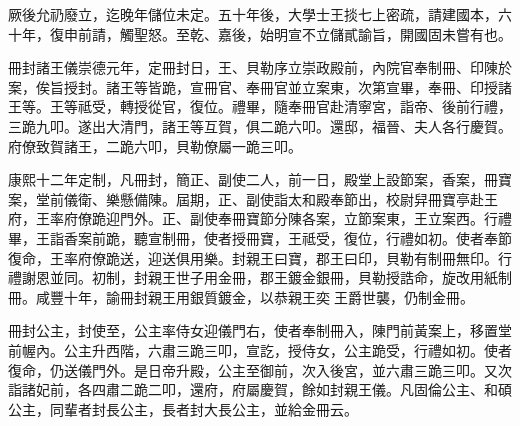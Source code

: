 \begin{pinyinscope}
厥後允礽廢立，迄晚年儲位未定。五十年後，大學士王掞七上密疏，請建國本，六十年，復申前請，觸聖怒。至乾、嘉後，始明宣不立儲貳諭旨，開國固未嘗有也。

冊封諸王儀崇德元年，定冊封日，王、貝勒序立崇政殿前，內院官奉制冊、印陳於案，俟旨授封。諸王等皆跪，宣冊官、奉冊官並立案東，次第宣畢，奉冊、印授諸王等。王等祗受，轉授從官，復位。禮畢，隨奉冊官赴清寧宮，詣帝、後前行禮，三跪九叩。遂出大清門，諸王等互賀，俱二跪六叩。還邸，福晉、夫人各行慶賀。府僚致賀諸王，二跪六叩，貝勒僚屬一跪三叩。

康熙十二年定制，凡冊封，簡正、副使二人，前一日，殿堂上設節案，香案，冊寶案，堂前儀衛、樂懸備陳。屆期，正、副使詣太和殿奉節出，校尉舁冊寶亭赴王府，王率府僚跪迎門外。正、副使奉冊寶節分陳各案，立節案東，王立案西。行禮畢，王詣香案前跪，聽宣制冊，使者授冊寶，王祗受，復位，行禮如初。使者奉節復命，王率府僚跪送，迎送俱用樂。封親王曰寶，郡王曰印，貝勒有制冊無印。行禮謝恩並同。初制，封親王世子用金冊，郡王鍍金銀冊，貝勒授誥命，旋改用紙制冊。咸豐十年，諭冊封親王用銀質鍍金，以恭親王奕王爵世襲，仍制金冊。

冊封公主，封使至，公主率侍女迎儀門右，使者奉制冊入，陳門前黃案上，移置堂前幄內。公主升西階，六肅三跪三叩，宣訖，授侍女，公主跪受，行禮如初。使者復命，仍送儀門外。是日帝升殿，公主至御前，次入後宮，並六肅三跪三叩。又次詣諸妃前，各四肅二跪二叩，還府，府屬慶賀，餘如封親王儀。凡固倫公主、和碩公主，同輩者封長公主，長者封大長公主，並給金冊云。


\end{pinyinscope}